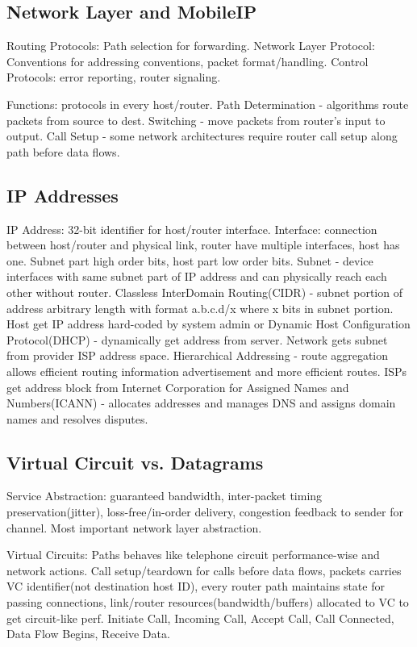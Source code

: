 \documentclass[9pt]{extarticle}
\begin{document}
\begin{multicols}{2}
\section{Network Layer and MobileIP}

Routing Protocols: Path selection for forwarding. Network Layer Protocol: Conventions for addressing conventions, packet format/handling. Control Protocols: error reporting, router signaling.

Functions: protocols in every host/router. Path Determination - algorithms route packets from source to dest.  Switching - move packets from router’s input to output. Call Setup - some network architectures require router call setup along path before data flows.

\subsection{IP Addresses}

IP Address: 32-bit identifier for host/router interface. Interface: connection between host/router and physical link, router have multiple interfaces, host has one. Subnet part high order bits, host part low order bits. Subnet - device interfaces with same subnet part of IP address and can physically reach each other without router. Classless InterDomain Routing(CIDR) - subnet portion of address arbitrary length with format a.b.c.d/x where x bits in subnet portion. Host get IP address hard-coded by system admin or Dynamic Host Configuration Protocol(DHCP) - dynamically get address from server. Network gets subnet from provider ISP address space. Hierarchical Addressing - route aggregation allows efficient routing information advertisement and more efficient routes. ISPs get address block from Internet Corporation for Assigned Names and Numbers(ICANN) - allocates addresses and manages DNS and assigns domain names and resolves disputes.

\subsection{Virtual Circuit vs. Datagrams}

Service Abstraction: guaranteed bandwidth, inter-packet timing preservation(jitter), loss-free/in-order delivery, congestion feedback to sender for channel. Most important network layer abstraction.

Virtual Circuits: Paths behaves like telephone circuit performance-wise and network actions. Call setup/teardown for calls before data flows, packets carries VC identifier(not destination host ID), every router path maintains state for passing connections, link/router resources(bandwidth/buffers) allocated to VC to get circuit-like perf. Initiate Call, Incoming Call, Accept Call, Call Connected, Data Flow Begins, Receive Data.


\end{multicols}
\end{document}
